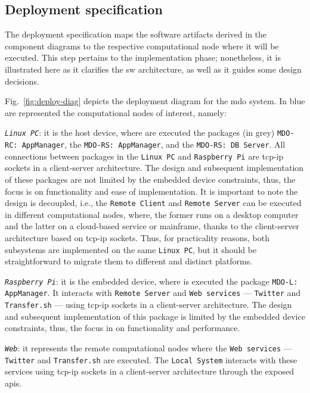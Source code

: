 %
\subsection{Deployment specification}
\label{sec:deployment-spec}
The deployment specification maps the software artifacts derived in the
component diagrams to the respective computational node where it will be
executed. This step pertains to the implementation phase; nonetheless, it is
illustrated here as it clarifies the \gls{sw} architecture, as well as it guides
some design decisions.

Fig.~\ref{fig:deploy-diag} depicts the deployment diagram for the \gls{mdo}
system. In blue are represented the computational nodes of interest, namely:
\begin{item-c}
\item
  \emph{\texttt{Linux PC}}:
  it is the host device, where are executed the packages
  (in grey) \texttt{MDO-RC: AppManager}, the \texttt{MDO-RS: AppManager}, and
  the \texttt{MDO-RS: DB Server}. All connections between packages in the
  \texttt{Linux PC} and \texttt{Raspberry Pi} are \gls{tcp-ip} sockets in
  a client-server architecture. The design and subsequent implementation of
  these packages are not limited by the embedded device constraints, thus, the
  focus is on functionality and ease of implementation. It is important to note
  the design is decoupled, i.e., the \texttt{Remote Client} and \texttt{Remote
    Server} can be executed in different computational nodes, where, the former
  runs on a desktop computer and the latter on a cloud-based service or
  mainframe, thanks to the client-server architecture based on \gls{tcp-ip}
  sockets. Thus, for practicality reasons, both subsystems are implemented on
  the same \texttt{Linux PC}, but it should be straightforward to migrate them
  to different and distinct platforms.
\item
  \emph{\texttt{Raspberry Pi}}:
  it is the embedded device, where is executed the package \texttt{MDO-L:
    AppManager}. It interacts with \texttt{Remote Server} and \texttt{Web
    services} --- \texttt{Twitter} and \texttt{Transfer.sh} --- using
  \gls{tcp-ip} sockets in a client-server architecture. The design and subsequent
  implementation of this package is limited by the embedded device constraints,
  thus, the focus in on functionality and performance.
\item
  \emph{\texttt{Web}}:
  it represents the remote computational nodes where the \texttt{Web services}
  --- \texttt{Twitter} and \texttt{Transfer.sh} are executed. The \texttt{Local
    System} interacts with these services using \gls{tcp-ip} sockets in a
  client-server architecture through the exposed \glspl{api}.
\end{item-c}
